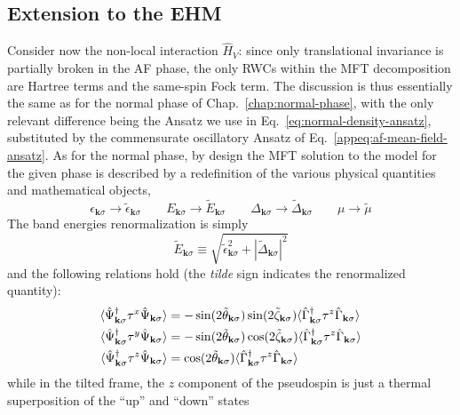 \subsection{Extension to the EHM}\label{subsec:af-ehm}

Consider now the non-local interaction $\hat H_V$: since only translational invariance is partially broken in the AF phase, the only RWCs within the MFT decomposition are Hartree terms and the same-spin Fock term. The discussion is thus essentially the same as for the normal phase of Chap.~\ref{chap:normal-phase}, with the only relevant difference being the Ansatz we use in Eq.~\eqref{eq:normal-density-ansatz}, substituted by the commensurate oscillatory Ansatz of Eq.~\eqref{appeq:af-mean-field-ansatz}. As for the normal phase, by design the MFT solution to the model for the given phase is described by a redefinition of the various physical quantities and mathematical objects,
\[
	\epsilon_{\mathbf{k}\sigma} \to \tilde{\epsilon}_{\mathbf{k}\sigma}
	\qquad
	E_{\mathbf{k}\sigma} \to \tilde{E}_{\mathbf{k}\sigma}
	\qquad
	\Delta_{\mathbf{k}\sigma} \to \tilde{\Delta}_{\mathbf{k}\sigma}
	\qquad
	\mu \to \tilde{\mu}
\]
The band energies renormalization is simply
\[
	\tilde{E}_{\mathbf{k}\sigma} \equiv \sqrt{\tilde{\epsilon}_{\mathbf{k}\sigma}^2 + |\tilde{\Delta}_{\mathbf{k}\sigma}|^2}
\]
and the following relations hold (the \textit{tilde} sign indicates the renormalized quantity):
\begin{align}
	\langle \hat \Psi_{\mathbf{k}\sigma}^\dagger \tau^x \hat \Psi_{\mathbf{k}\sigma} \rangle &= -\sin \normalfont(2\tilde{\theta}_{\mathbf{k}\sigma}) \sin \normalfont(2\tilde{\zeta}_{\mathbf{k}\sigma}) \langle \hat \Gamma_{\mathbf{k}\sigma}^\dagger \tau^z \hat \Gamma_{\mathbf{k}\sigma} \rangle \label{eq:af-x-expectation-non-local}\\
	\langle \hat \Psi_{\mathbf{k}\sigma}^\dagger \tau^y \hat \Psi_{\mathbf{k}\sigma} \rangle &= -\sin \normalfont(2\tilde{\theta}_{\mathbf{k}\sigma}) \cos \normalfont(2\tilde{\zeta}_{\mathbf{k}\sigma}) \langle \hat \Gamma_{\mathbf{k}\sigma}^\dagger \tau^z \hat \Gamma_{\mathbf{k}\sigma} \rangle \label{eq:af-y-expectation-non-local}\\
	\langle \hat \Psi_{\mathbf{k}\sigma}^\dagger \tau^z \hat \Psi_{\mathbf{k}\sigma} \rangle &= \cos \normalfont(2\tilde{\theta}_{\mathbf{k}\sigma}) \langle \hat \Gamma_{\mathbf{k}\sigma}^\dagger \tau^z \hat \Gamma_{\mathbf{k}\sigma} \rangle \label{eq:af-z-expectation-non-local}
\end{align}
while in the tilted frame, the $z$ component of the pseudospin is just a thermal superposition of the ``up'' and ``down'' states
